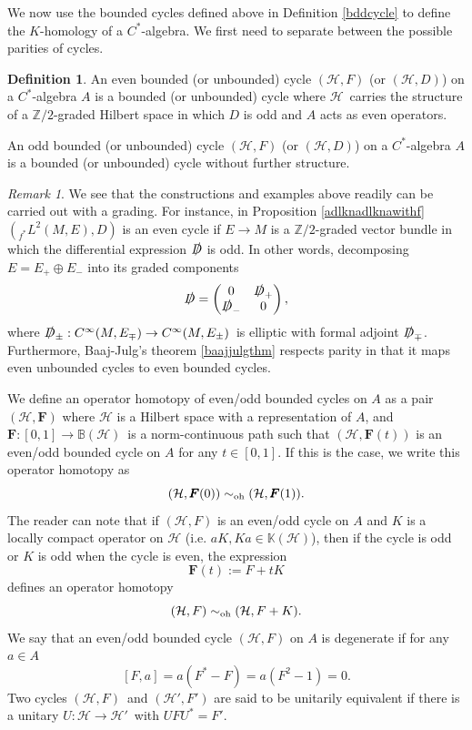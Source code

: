 \documentclass[a4paper,reqno]{amsart}
\numberwithin{equation}{section}
\def\Z{\mathbb{Z}}
\theoremstyle{definition}
\newtheorem{definition}[thm]{Definition}
\theoremstyle{remark}
\newtheorem{remark}[thm]{Remark}
\begin{document}
We now use the bounded cycles defined above in Definition \ref{bddcycle} to define the $K$-homology of a $C^*$-algebra. We first need to separate between the possible parities of cycles. 


\begin{definition}
An even bounded (or unbounded) cycle $(\mathcal{H},F)$ (or $(\mathcal{H},D)$) on a $C^*$-algebra $A$ is a bounded (or unbounded) cycle where $\mathcal{H}$ carries the structure of a $\Z/2$-graded Hilbert space in which $D$ is odd and $A$ acts as even operators. 
 
An odd bounded (or unbounded) cycle $(\mathcal{H},F)$ (or $(\mathcal{H},D)$) on a $C^*$-algebra $A$ is a bounded (or unbounded) cycle without further structure.
\end{definition}


\begin{remark}
We see that the constructions and examples above readily can be carried out with a grading. For instance, in Proposition \ref{adlknadlknawithf} $(_{f^*}L^2(M,E),D)$ is an even cycle if $E\to M$ is a $\Z/2$-graded vector bundle in which the differential expression $\slashed{D}$ is odd. In other words, decomposing $E=E_+\oplus E_-$ into its graded components
$$ \slashed{D}=\begin{pmatrix}0& \slashed{D}_+\\\slashed{D}_-& 0\end{pmatrix},$$
where $\slashed{D}_\pm:C^\infty(M,E_\mp)\to C^\infty(M,E_\pm)$ is elliptic with formal adjoint $\slashed{D}_\mp$. Furthermore, Baaj-Julg's theorem \ref{baajjulgthm} respects parity in that it maps even unbounded cycles to even bounded cycles.
\end{remark}


We define an operator homotopy of even/odd bounded cycles on $A$ as a pair $(\mathcal{H},\pmb{F})$ where $\mathcal{H}$ is a Hilbert space with a representation of $A$, and $\pmb{F}:[0,1]\to \mathbb{B}(\mathcal{H})$ is a norm-continuous path such that $(\mathcal{H},\pmb{F}(t))$ is an even/odd bounded cycle on $A$ for any $t\in [0,1]$. If this is the case, we write this operator homotopy as 
$$(\mathcal{H},\pmb{F}(0))\sim_{\rm oh}(\mathcal{H},\pmb{F}(1)).$$
The reader can note that if $(\mathcal{H},F)$ is an even/odd cycle on $A$ and $K$ is a locally compact operator on $\mathcal{H}$ (i.e. $aK,Ka\in \mathbb{K}(\mathcal{H})$), then if the cycle is odd or $K$ is odd when the cycle is even, the expression
$$\pmb{F}(t):=F+tK$$
defines an operator homotopy 
$$(\mathcal{H},F)\sim_{\rm oh}(\mathcal{H},F+K).$$
We say that an even/odd bounded cycle $(\mathcal{H},F)$ on $A$ is degenerate if for any $a\in A$
$$[F,a]=a(F^*-F)=a(F^2-1)=0.$$
Two cycles $(\mathcal{H},F)$ and $(\mathcal{H}',F')$ are said to be unitarily equivalent if there is a unitary $U:\mathcal{H}\to \mathcal{H}'$ with $UFU^*=F'$.
\end{document}
